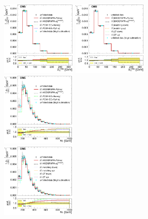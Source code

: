 \begin{figure}[hbtp]
    \centering
     \includegraphics[width=0.33\textwidth]{Chapters/04_Analysis/04b_XSections/images/results/fit/7TeV/MET/central/normalised_xsection_combined_different_generators_with_bkgd_subtraction_results.pdf}\hfill
     \includegraphics[width=0.33\textwidth]{Chapters/04_Analysis/04b_XSections/images/results/fit/7TeV/MET/central/normalised_xsection_combined_systematics_shifts_with_bkgd_subtraction_results.pdf}\hfill
     \includegraphics[width=0.33\textwidth]{Chapters/04_Analysis/04b_XSections/images/results/fit/7TeV/HT/central/normalised_xsection_combined_different_generators_with_bkgd_subtraction_results.pdf}\\
     \includegraphics[width=0.33\textwidth]{Chapters/04_Analysis/04b_XSections/images/results/fit/7TeV/HT/central/normalised_xsection_combined_systematics_shifts_with_bkgd_subtraction_results.pdf}\hfill

\end{figure}
